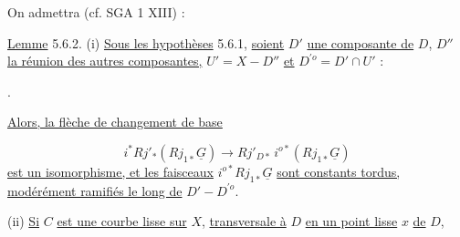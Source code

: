 On admettra (cf. SGA 1 XIII\hspace{2.5em}) :

\underline{Lemme} 5.6.2. (i) \underline{Sous les hypothèses} 5.6.1, \underline{soient} $D'$ \underline{une composante de} $D$, $D''$ \underline{la réunion des autres composantes,} $U' = X-D''$ \underline{et} $D^{\prime o} = D'\cap U'$ :

\begin{center}
\end{center}
.

\underline{Alors, la flèche de changement de base}

\begin{equation*}
i^* Rj'_* (Rj_{1*} \underline{G}) \longrightarrow Rj'_{D*}\, i^{o*} (Rj_{1*}\underline{G})
\end{equation*}
\underline{est un isomorphisme, et les faisceaux} $i^{o*}Rj_{1*}\underline{G}$ \underline{sont constants tordus, modérément ramifiés le long de} $D' - D^{\prime o}$.

(ii) \underline{Si} $C$ \underline{est une courbe lisse sur} $X$, \underline{transversale à} $D$ \underline{en un point lisse} $x$ \underline{de} $D$,

